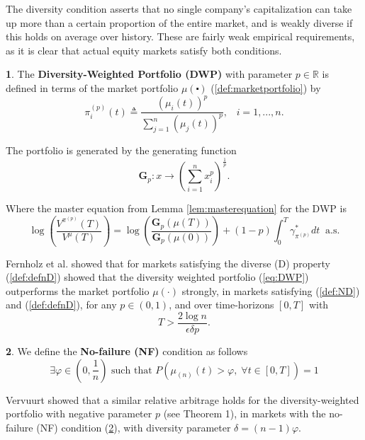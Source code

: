 \documentclass[british]{amsart} \usepackage{lmodern}
\numberwithin{equation}{section} \numberwithin{figure}{section}
\theoremstyle{plain} \newtheorem{thm}{\protect\theoremname}[section]
\theoremstyle{definition} \newtheorem{defn}[thm]{\protect\definitionname}
\theoremstyle{plain} \newtheorem{assumption}[thm]{\protect\assumptionname}
\theoremstyle{plain} \newtheorem{lem}[thm]{\protect\lemmaname}
\theoremstyle{plain} \newtheorem{prop}[thm]{\protect\propositionname}
\theoremstyle{remark} \newtheorem{rem}[thm]{\protect\remarkname}
\theoremstyle{plain} \newtheorem{cor}[thm]{\protect\corollaryname}
\begin{document}
The diversity condition asserts that no single company's
capitalization can take up more than a certain proportion of the entire
market, and is weakly diverse if this holds on average over history.
These are fairly weak empirical requirements, as it is clear that
actual equity markets satisfy both conditions.

\begin{defn}
The \textbf{Diversity-Weighted Portfolio (DWP) }with parameter $p\in\mathbb{R}$
is defined in terms of the market portfolio $\mu(\centerdot)$ (\ref{def:marketportfolio})
by
\begin{equation}
\pi_{i}^{(p)}(t)\triangleq\frac{\left(\mu_{i}(t)\right)^{p}}{\sum_{j=1}^{n}\left(\mu_{j}(t)\right)^{p}},\;\;\;i=1,...,n.\label{eq:DWP}
\end{equation}

The portfolio is generated by the generating function
\begin{equation}
\mathbf{G}_{p}:x\to\left(\sum_{i=1}^{n}x_{i}^{p}\right)^{\frac{1}{p}}.
\end{equation}

Where the master equation from Lemma \ref{lem:masterequation} for the DWP
is
\begin{equation}
\log\left(\frac{V^{\pi^{(p)}}(T)}{V^{\mu}(T)}\right)=\log\left(\frac{\mathbf{G}_{p}(\mu(T))}{\mathbf{G}_{p}(\mu(0))}\right)+(1-p)\int_{0}^{T}\gamma_{\pi^{(p)}}^{*}dt\;\;\text{a.s.}
\end{equation}
\end{defn}
Fernholz et al. \cite{fernholz2005} showed that for markets satisfying
the diverse (D) property (\ref{def:defnD}) showed that the diversity
weighted portfolio (\ref{eq:DWP}) outperforms the market portfolio
$\mu(\cdot)$ strongly, in markets satisfying (\ref{def:ND}) and
(\ref{def:defnD}), for any $p\in(0,1)$, and over time-horizons $[0,T]$
with
\begin{equation}
T>\frac{2\log n}{\epsilon\delta p}.
\end{equation}

\begin{defn}
\label{def:NF}We define the \textbf{No-failure (NF) }condition as
follows
\begin{equation}
\exists\varphi\in(0,\frac{1}{n})\text{ such that }P\left(\mu_{(n)}(t)>\varphi,\;\forall t\in[0,T]\right)=1
\end{equation}

Vervuurt \cite{vervuurt2015} showed that a similar relative arbitrage
holds for the diversity-weighted portfolio with negative parameter
$p$ (see Theorem 1\cite{vervuurt2015}), in markets with the no-failure
(NF) condition (\ref{def:NF}), with diversity parameter $\delta=(n-1)\varphi$.
\end{defn}
%
\end{document}
